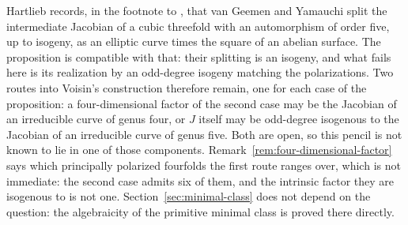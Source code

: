 Hartlieb records, in the footnote to \cite[Remark~5.8]{Hartlieb}, that van
Geemen and Yamauchi split the intermediate Jacobian of a cubic threefold with
an automorphism of order five, up to isogeny, as an elliptic curve times the
square of an abelian surface.  The proposition is compatible with that: their
splitting is an isogeny, and what fails here is its realization by an
odd-degree isogeny matching the polarizations.  Two routes into Voisin's
construction therefore remain, one for each case of the proposition: a
four-dimensional factor of the second case may be the Jacobian of an
irreducible curve of genus four, or \(J\) itself may be odd-degree isogenous
to the Jacobian of an irreducible curve of genus five.  Both are open, so this
pencil is not known to lie in one of those components.
Remark~\ref{rem:four-dimensional-factor} says which principally polarized
fourfolds the first route ranges over, which is not immediate: the second case
admits six of them, and the intrinsic factor they are isogenous to is not one.
Section~\ref{sec:minimal-class} does not depend on the question: the
algebraicity of the primitive minimal class is proved there directly.

